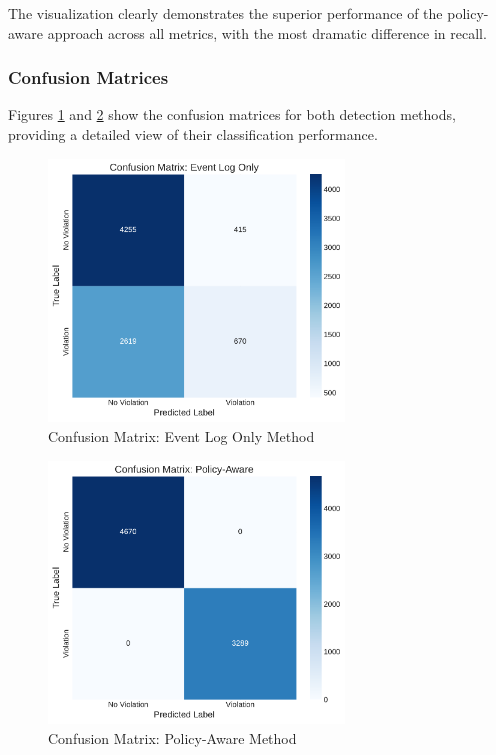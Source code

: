 The visualization clearly demonstrates the superior performance of the policy-aware approach across all metrics, with the most dramatic difference in recall.

\subsubsection{Confusion Matrices}

Figures \ref{fig:eventlog-confusion} and \ref{fig:policy-confusion} show the confusion matrices for both detection methods, providing a detailed view of their classification performance.

\begin{figure}[h]
\centering
\includegraphics[width=0.7\textwidth]{figures/eventlog_confusion_matrix.pdf}
\caption{Confusion Matrix: Event Log Only Method}
\label{fig:eventlog-confusion}
\end{figure}

\begin{figure}[h]
\centering
\includegraphics[width=0.7\textwidth]{figures/policy_confusion_matrix.pdf}
\caption{Confusion Matrix: Policy-Aware Method}
\label{fig:policy-confusion}
\end{figure}

